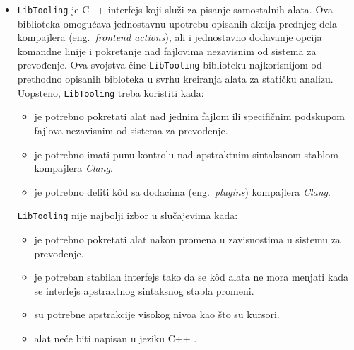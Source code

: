 \documentclass[12pt,oneside]{memoir}
\begin{document}
\begin{itemize}
\item \texttt{LibTooling} je C++ interfejs koji slu\v{z}i za pisanje samostalnih alata. Ova biblioteka omogu\'{c}ava jednostavnu
upotrebu opisanih akcija prednjeg dela kompajlera (eng.~\textit{frontend actions}), ali i jednostavno dodavanje opcija komandne linije i pokretanje nad fajlovima 
nezavisnim od sistema za prevođenje. Ova svojstva \v{c}ine \texttt{LibTooling} biblioteku najkorisnijom od prethodno opisanih bibloteka u svrhu kreiranja alata za stati\v{c}ku analizu.
Uopsteno, \texttt{LibTooling} treba koristiti kada:
\begin{itemize}
  \item je potrebno pokretati alat nad jednim fajlom ili specifi\v{c}nim podskupom fajlova nezavisnim od sistema za prevođenje.
  \item je potrebno imati punu kontrolu nad apstraktnim sintaksnom stablom kompajlera \textit{Clang}.
  \item je potrebno deliti k\^{o}d sa dodacima (eng.~\textit{plugins}) kompajlera \textit{Clang}.
\end{itemize}
\texttt{LibTooling} nije najbolji izbor u slu\v{c}ajevima kada:
\begin{itemize}
  \item je potrebno pokretati alat nakon promena u zavisnostima u sistemu za prevođenje.
  \item je potreban stabilan interfejs tako da se k\^{o}d alata ne mora menjati kada se interfejs apstraktnog sintaksnog stabla promeni.
  \item su potrebne apstrakcije visokog nivoa kao \v{s}to su kursori.
  \item alat ne\'{c}e biti napisan u jeziku C++ \cite{RightInterface}.
\end{itemize}
\end{itemize}
\end{document}
